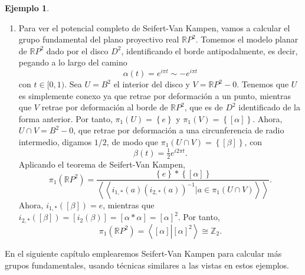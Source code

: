 \documentclass[12pt,a4paper]{book}
\theoremstyle{definition} \newtheorem{defn}[thm]{Definición}
\theoremstyle{definition} \newtheorem{ejemplo}[thm]{Ejemplo}
\theoremstyle{definition} \newtheorem{ejercicio}[thm]{Ejercicio}
\theoremstyle{remark} \newtheorem*{obs}{Observación}
\def\ZZ{\mathbb{Z}}
\def\RR{\mathbb{R}}
\def\gf{\pi_1}
\newcommand\gen[1]{\left\langle #1 \right\rangle}
\newcommand\ngen[1]{\left\langle\left\langle #1 \right\rangle \right\rangle}
\begin{document}
\begin{ejemplo}
\begin{enumerate}
     \item Para ver el potencial completo de Seifert-Van Kampen, vamos a calcular el grupo fundamental del plano proyectivo real $\RR P^2$. Tomemos el modelo planar de $\RR P^2$ dado por el disco $D^2$, identificando el borde antipodalmente, es decir, pegando a lo largo del camino 
       \begin{equation*}
	 \alpha(t)=e^{i\pi t}\sim -e^{i\pi t}
       \end{equation*}
       con $t\in [0,1)$. Sea $U=B^2$ el interior del disco y $V=\RR P^2-{0}$. Tenemos que $U$ es simplemente conexo ya que retrae por deformación a un punto, mientras que $V$ retrae por deformación al borde de $\RR P^2$, que es de $D^2$ identificado de la forma anterior. Por tanto, $\gf(U)=\left\{ e \right\}$ y $\gf(V)=\left\{ [\alpha] \right\}$. Ahora, $U\cap V=B^2-{0}$, que retrae por deformación a una circunferencia de radio intermedio, digamos $1/2$, de modo que $\gf(U\cap V)=\left\{ [\beta] \right\}$, con 
       \begin{equation*}
	 \beta(t)=\tfrac{1}{2}e^{i2\pi t}.
       \end{equation*}
       Aplicando el teorema de Seifert-Van Kampen, 
       \begin{equation*}
	 \gf(\RR P^2)=\frac{\left\{ e \right\}*\left\{ [\alpha] \right\}}{\ngen{i_{1,*}(a)(i_{2,*}(a))^{-1}|a\in \gf(U\cap V)}}.
       \end{equation*}
       Ahora, $i_{1,*}([\beta])=e$, mientras que $i_{2,*}([\beta])=[i_2(\beta)]=[\alpha*\alpha]=[\alpha]^2$. Por tanto, 
       \begin{equation*}
	 \gf(\RR P^2)=\gen{[\alpha]\left|[\alpha]^2\right.}\cong \ZZ_2.
       \end{equation*}
   \end{enumerate}
 \end{ejemplo}

 En el siguiente capítulo emplearemos Seifert-Van Kampen para calcular más grupos fundamentales, usando técnicas similares a las vistas en estos ejemplos.
\end{document}
